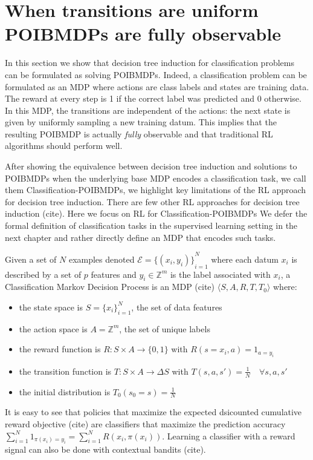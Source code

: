 \chapter{When transitions are uniform POIBMDPs are fully observable}
In this section we show that decision tree induction for classification problems can be formulated as solving POIBMDPs.
Indeed, a classification problem can be formulated as an MDP where actions are class labels and states are training data.
The reward at every step is 1 if the correct label was predicted and 0 otherwise.
In this MDP, the transitions are independent of the actions: the next state is given by uniformly sampling a new training datum. 
This implies that the resulting POIBMDP is actually \textit{fully} observable and that traditional RL algorithms should perform well.

After showing the equivalence between decision tree induction and solutions to POIBMDPs when the underlying base MDP encodes a classification task, we call them Classification-POIBMDPs, we highlight key limitations of the RL approach for decision tree induction.
There are few other RL approaches for decision tree induction (cite). Here we focus on RL for Classification-POIBMDPs
We defer the formal definition of classification tasks in the supervised learning setting in the next chapter and rather directly define an MDP that encodes such tasks. 
\begin{definition}
    Given a set of $N$ examples denoted $\mathcal{E} = {\{(x_i, y_i)\}}_{i=1}^N$ where each datum $x_i$ is described by a set of $p$ features and $y_i \in \mathbb{Z}^m$ is the label associated with $x_i$, a Classification Markov Decision Process is an MDP (cite) $\langle S, A, R, T, T_0 \rangle$ where:
    \begin{itemize}
        \item the state space is $S={\{x_i\}}_{i=1}^N$, the set of data features
        \item the action space is $A=\mathbb{Z}^m$, the set of unique labels
        \item the reward function is $R:S\times A \rightarrow \{0, 1\}$ with $R(s=x_i, a) = 1_{a=y_i}$
        \item the transition function is $T:S\times A \rightarrow \Delta S$ with $T(s, a, s') = \frac{1}{N} \quad \forall s, a, s'$
        \item the initial distribution is $T_0(s_0 = s) = \frac{1}{N}$
    \end{itemize}
\end{definition}
It is easy to see that policies that maximize the expected dsicounted cumulative reward objective (cite) are classifiers that maximize the prediction accuracy $\sum_{i=1}^N 1_{\pi(x_i)=y_i} = \sum_{i=1}^N R(x_i, \pi(x_i))$.
Learning a classifier with a reward signal can also be done with contextual bandits (cite).

